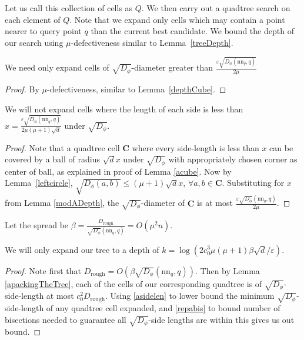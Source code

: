 \documentclass[11pt]{myclass}
\newcommand{\breg}{\ensuremath{D_\phi}}
\newcommand{\eps}{\varepsilon}
\begin{document}
Let us call this collection of cells as $Q$. We then carry out a quadtree search on each element
of $Q$. Note that we expand only cells which may contain a point nearer to query point $q$
than the current best candidate. We bound the depth of our search using $\mu$-defectiveness
similar to Lemma~\ref{treeDepth}.


\begin{lemma}\label{modADepth}
 We need only expand cells of $\sqrt{\breg}$-diameter greater than 
$\frac{\eps  \sqrt{\breg( \text{nn}_q,q)}}{2 \mu}$
\end{lemma}

\begin{proof}
 By $\mu$-defectiveness, similar to Lemma~\ref{depthCube}.
\end{proof}

\begin{corollary}\label{asidelen}
 We will not expand cells where the length of each side is less than 
$x =\frac{\eps \sqrt{ \breg( \text{nn}_q,q)}}{2 \mu (\mu+1) \sqrt{d}}$ under $\sqrt{\breg}$.
\end{corollary}

 \begin{proof}
Note that a quadtree cell $\textbf{C}$ where every side-length is less than $x$ can be covered by a ball of radius $\sqrt{d} x$ under 
 $\sqrt{\breg}$ with appropriately chosen corner as center of ball, 
as explained in proof of Lemma \ref{acube}. Now by Lemma~\ref{leftcircle}, 
$\sqrt{\breg(a,b)} \leq (\mu+1) \sqrt{d} x$, $\forall a,b \in \textbf{C}$. 
Substituting for $x$ from Lemma \ref{modADepth}, the $\sqrt{\breg}$-diameter of $\textbf{C}$ is at 
most $\frac{\eps \sqrt{\breg}(\text{nn}_q,q)}{2 \mu}$.
 \end{proof}

Let the spread be $\beta = \frac{D_{\text{rough}}}{\sqrt{\breg}(\text{nn}_q, q)} = O(\mu^2 n)$.
\begin{lemma}\label{AfinalTreeDepth}
We will only expand our tree to a depth of 
$k = \log(2 c_0^3 \mu (\mu+1) \beta \sqrt{d} / \eps)$.
\end{lemma}

\begin{proof}
 Note first that $D_{\text{rough}}= O \left(\beta \sqrt{\breg} ( \text{nn}_q,q) \right)$. Then 
by Lemma \ref{apackingTheTree}, each of the cells of our corresponding quadtree is of $\sqrt{\breg}$-side-length at most
$c_0^2 D_{\text{rough}}$.  Using \ref{asidelen} to lower bound the minimum $\sqrt{\breg}$-side-length of any quadtree cell expanded, and \ref{repabis} to bound number of bisections needed to guarantee all $\sqrt{\breg}$-side lengths are within this  gives us out bound.
\end{proof}
\end{document}
